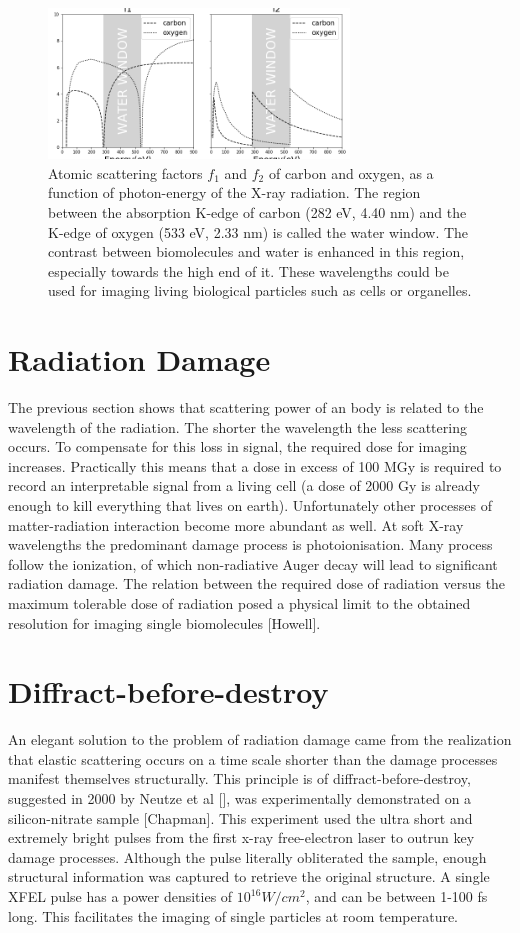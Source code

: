 \begin{figure}[h]\label{fig:waterwindow}
\centering 
\includegraphics[width=80mm]{waterwindow.png}

\caption{Atomic scattering factors $f_1$ and $f_2$ of carbon and oxygen, as a function of photon-energy of the X-ray radiation. The region between the absorption K-edge of carbon (282 eV, 4.40 nm) and the K-edge of oxygen (533 eV, 2.33 nm) is called the water window.  The contrast between biomolecules and water is enhanced in this region, especially towards the high end of it. These wavelengths could be used for imaging living biological particles such as cells or organelles.}
\end{figure}

\section{Radiation Damage}
The previous section shows that scattering power of an body is related to the wavelength of the radiation. The shorter the wavelength the less scattering occurs. To compensate for this loss in signal, the required dose for imaging increases. Practically this means that a dose in excess of 100 MGy is required to record an interpretable signal from a living cell (a dose of 2000 Gy is already enough to kill everything that lives on earth). Unfortunately other processes of matter-radiation interaction become more abundant as well. At soft X-ray wavelengths the predominant damage process is photoionisation. Many process follow the ionization, of which non-radiative Auger decay will lead to significant radiation damage. The relation between the required dose of radiation versus the maximum tolerable dose of radiation posed a physical limit to the obtained resolution for imaging single biomolecules [Howell].

\section{Diffract-before-destroy}
An elegant solution to the problem of radiation damage came from the realization that elastic scattering occurs on a  time scale shorter than the damage processes manifest themselves structurally. This principle is of diffract-before-destroy, suggested in 2000 by Neutze et al [], was experimentally demonstrated on a silicon-nitrate sample [Chapman]. This experiment used the ultra short and extremely bright pulses from the first x-ray free-electron laser to outrun key damage processes. Although the pulse literally obliterated the sample, enough structural information was captured to retrieve the original structure. A single XFEL pulse has a power densities of $10^16 W/cm^2$, and can be between 1-100 fs long. This facilitates the imaging of single particles at room temperature.

